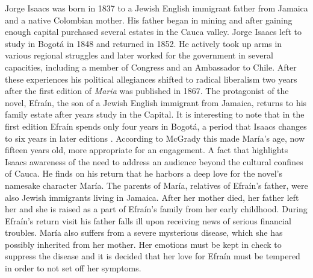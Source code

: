 \documentclass[12pt]{report}
\begin{document}
Jorge Isaacs was born in 1837 to a Jewish English immigrant father from Jamaica and a native Colombian mother. His father began in mining and after gaining enough capital purchased several estates in the Cauca valley. Jorge Isaacs left to study in Bogotá in 1848 and returned in 1852. He actively took up arms in various regional struggles and later worked for the government in several capacities, including a member of Congress and an Ambassador to Chile. After these experiences his political allegiances shifted to radical liberalism two years after the first edition of \textit{Maria} was published in 1867. 
The protagonist of the novel, Efraín, the son of a Jewish English immigrant from Jamaica, returns to his family estate after years study in the Capital.
It is interesting to note that in the first edition Efraín spends only four years in Bogotá, a period that Isaacs changes to six years in later editions \autocite[67]{Isaacs2012}. According to McGrady this made María's age, now fifteen years old, more appropriate for an engagement. A fact that highlights Isaacs awareness of the need to address an audience beyond the cultural confines of Cauca.
He finds on his return that he harbors a deep love for the novel's namesake character María.
The parents of María, relatives of Efraín's father, were also Jewish immigrants living in Jamaica.
After her mother died, her father left her and she is raised as a part of Efraín's family from her early childhood.
During Efraín's return visit his father falls ill upon receiving news of serious financial troubles.
María also suffers from a severe mysterious disease, which she has possibly inherited from her mother.
Her emotions must be kept in check to suppress the disease and it is decided that her love for Efraín must be tempered in order to not set off her symptoms.
\end{document}
